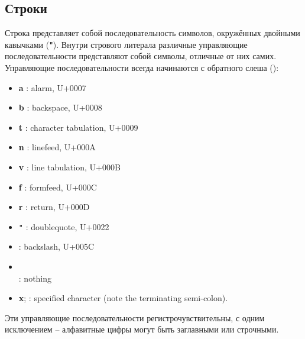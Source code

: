 \subsection{Строки}

\vest Строка представляет собой последовательность символов, окружённых двойными кавычками
({\bfseries\cf "}). Внутри стрового литерала различные управляющие
последовательности представляют собой символы, отличные от них
самих. Управляющие последовательности всегда начинаются с обратного слеша
({\bfseries\backwhack{}}):

\begin{itemize}
\item{\bfseries\cf\backwhack{}a} : alarm, U+0007
\item{\bfseries\cf\backwhack{}b} : backspace, U+0008
\item{\bfseries\cf\backwhack{}t} : character tabulation, U+0009
\item{\bfseries\cf\backwhack{}n} : linefeed, U+000A
\item{\bfseries\cf\backwhack{}v} : line tabulation, U+000B
\item{\bfseries\cf\backwhack{}f} : formfeed, U+000C
\item{\bfseries\cf\backwhack{}r} : return, U+000D
\item{\bfseries\cf\backwhack{}}\verb|"| : doublequote, U+0022
\item{\bfseries\cf\backwhack{}\backwhack{}} : backslash, U+005C
\item{\bfseries\cf\backwhack{}}\\\hspace*{2em} : nothing
\item{{\bfseries\cf\backwhack{}x};} : specified character (note the
  terminating semi-colon).
\end{itemize}

Эти управляющие последовательности регистрочувствительны, с одним исключением -- алфавитные
цифры  могут быть заглавными или строчными.

